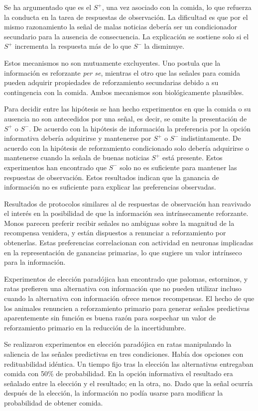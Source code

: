 \documentclass[a4paper,12pt]{article}
\begin{document}
Se ha argumentado que es el $S^{+}$, una vez asociado con la comida, lo que refuerza la conducta en la tarea de respuestas de observación. La dificultad es que por el mismo razonamiento la señal de malas noticias debería ser un condicionador secundario para la ausencia de consecuencia. La explicación se sostiene solo si el $S^{+}$ incrementa la respuesta más de lo que $S^{-}$ la disminuye.

Estos mecanismos no son mutuamente excluyentes. Uno postula que la información es reforzante {\itshape per se}, mientras el otro que las señales para comida pueden adquirir propiedades de reforzamiento secundarias debido a su contingencia con la comida. Ambos mecanismos son biológicamente plausibles.

Para decidir entre las hipótesis se han hecho experimentos en que la comida o su ausencia no son antecedidos por una señal, es decir, se omite la presentación de $S^{+}$ o $S^{-}$. De acuerdo con la hipótesis de información la preferencia por la opción informativa debería adquirirse y mantenerse por $S^{+}$ o $S^{-}$ indistintamente. De acuerdo con la hipótesis de reforzamiento condicionado solo debería adquirirse o mantenerse cuando la señala de buenas noticias $S^{+}$ está presente. Estos experimentos han encontrado que $S^{-}$ solo no es suficiente para mantener las respuestas de observación. Estos resultados indican que la ganancia de información no es suficiente para explicar las preferencias observadas.

Resultados de protocolos similares al de respuestas de observación han reavivado el interés en la posibilidad de que la información sea intrínsecamente reforzante. Monos parecen preferir recibir señales no ambiguas sobre la magnitud de la recompensa venidera, y están dispuestos a renunciar a reforzamiento por obtenerlas. Estas preferencias correlacionan con actividad en neuronas implicadas en la representación de ganancias primarias, lo que sugiere un valor intrínseco para la información.

Experimentos de elección paradójica han encontrado que palomas, estorninos, y ratas prefieren una alternativa con información que no pueden utilizar incluso cuando la alternativa con información ofrece menos recompensas. El hecho de que los animales renuncien a reforzamiento primario para generar señales predictivas aparentemente sin función es buena razón para sospechar un valor de reforzamiento primario en la reducción de la incertidumbre.

Se realizaron experimentos en elección paradójica en ratas manipulando la saliencia de las señales predictivas en tres condiciones. Había dos opciones con redituabilidad idéntica. Un tiempo fijo tras la elección las alternativas entregaban comida con 50\% de probabilidad. En la opción informativa el resultado era señalado entre la elección y el resultado; en la otra, no. Dado que la señal ocurría después de la elección, la información no podía usarse para modificar la probabilidad de obtener comida.
\end{document}
